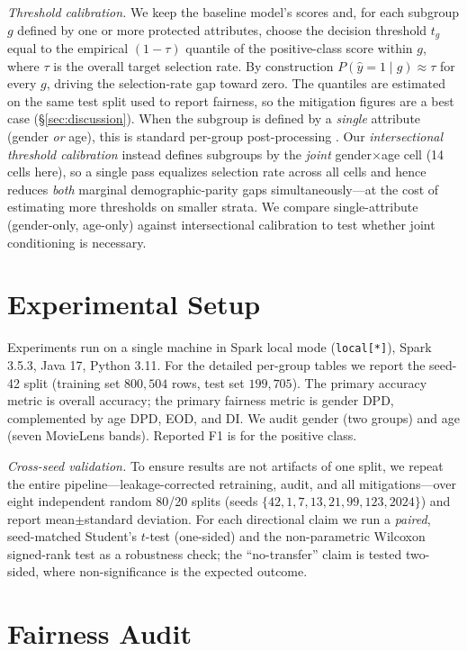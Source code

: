 \documentclass[conference]{IEEEtran}
\begin{document}
\emph{Threshold calibration.} We keep the baseline model's scores and, for each subgroup
$g$ defined by one or more protected attributes, choose the decision threshold $t_g$ equal
to the empirical $(1-\tau)$ quantile of the positive-class score within $g$, where $\tau$
is the overall target selection rate. By construction $P(\hat y=1\mid g)\approx\tau$ for
every $g$, driving the selection-rate gap toward zero. The quantiles are estimated on
the same test split used to report fairness, so the mitigation figures are a best case
(\S\ref{sec:discussion}). When the subgroup is defined by a
\emph{single} attribute (gender \emph{or} age), this is standard per-group post-processing
\cite{hardt2016equality}. Our \emph{intersectional threshold calibration} instead defines
subgroups by the \emph{joint} gender$\times$age cell (14 cells here), so a single pass
equalizes selection rate across all cells and hence reduces \emph{both} marginal
demographic-parity gaps simultaneously---at the cost of estimating more thresholds on
smaller strata. We compare single-attribute (gender-only, age-only) against intersectional
calibration to test whether joint conditioning is necessary.

\section{Experimental Setup}\label{sec:setup}
Experiments run on a single machine in Spark local mode (\texttt{local[*]}),
Spark 3.5.3, Java 17, Python 3.11. For the detailed per-group tables we report the
seed-42 split (training set $800{,}504$ rows, test set $199{,}705$). The primary
accuracy metric is overall accuracy; the primary fairness metric is gender DPD,
complemented by age DPD, EOD, and DI. We audit gender (two groups) and age (seven
MovieLens bands). Reported F1 is for the positive class.

\textit{Cross-seed validation.} To ensure results are not artifacts of one split, we
repeat the entire pipeline---leakage-corrected retraining, audit, and all
mitigations---over eight independent random 80/20 splits (seeds
$\{42,1,7,13,21,99,123,2024\}$) and report mean$\pm$standard deviation. For each
directional claim we run a \emph{paired}, seed-matched Student's $t$-test (one-sided) and
the non-parametric Wilcoxon signed-rank test as a robustness check; the ``no-transfer''
claim is tested two-sided, where non-significance is the expected outcome.

\section{Fairness Audit}\label{sec:audit}
\end{document}
